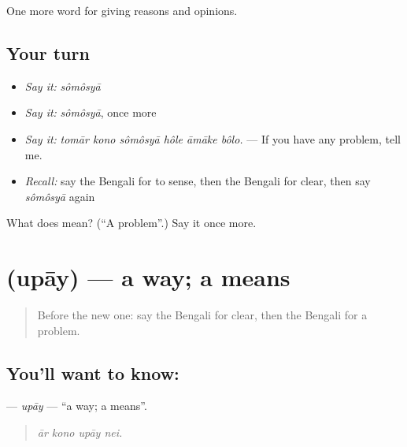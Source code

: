 \begin{grammarlens}[title={What you've built}]
One more word for giving reasons and opinions.
\end{grammarlens}

\subsection*{Your turn}
\begin{itemize}
\raggedright
  \item \emph{Say it:} \emph{sômôsyā}
  \item \emph{Say it:} \emph{sômôsyā}, once more
  \item \emph{Say it:} \emph{tomār kono sômôsyā hôle āmāke bôlo.} — If you have any problem, tell me.
  \item \emph{Recall:} say the Bengali for to sense, then the Bengali for clear, then say \emph{sômôsyā} again
\end{itemize}

\begin{tcolorbox}[breakable,colback=teal!4,colframe=teal!35!black,title={Before you move on}]
What does  mean? (\textquotedblleft{}A problem\textquotedblright{}.) Say it once more.
\end{tcolorbox}
\section[\texorpdfstring{\bn{উপায়} (upāy)}{উপায় (upāy)}]{ (upāy) — a way; a means}

\label{lesson:BN-C363-upay}



\begin{quote}
Before the new one: say the Bengali for clear, then the Bengali for a problem.
\end{quote}

\subsection*{You'll want to know: }
\textbf{} — \emph{upāy} — \textquotedblleft{}a way; a means\textquotedblright{}.

\begin{quote}
   
\end{quote}

\begin{quote}
\emph{ār kono upāy nei.}
\end{quote}

